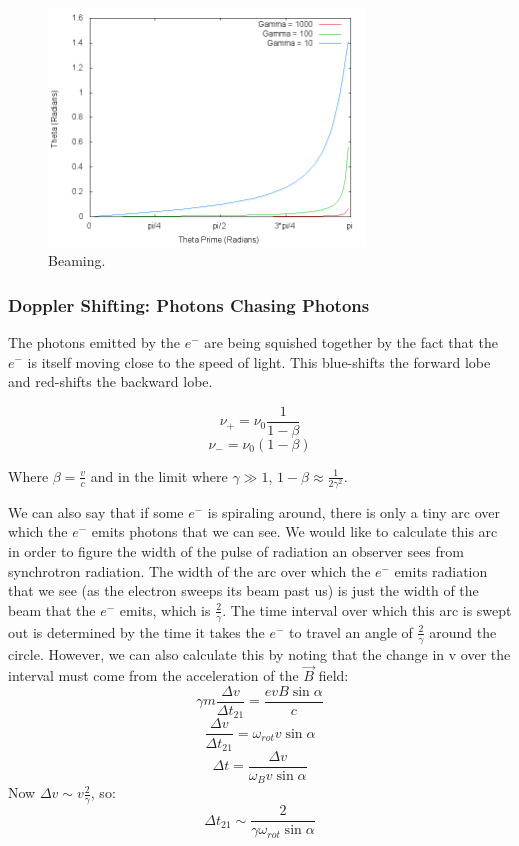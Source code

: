 \documentclass{article}
\begin{document}
\begin{figure}
    \centering
    \includegraphics[width=0.75\textwidth]{figures/Beam.png}
    \caption{Beaming.}
    \label{fig:beam}
\end{figure}

\subsubsection{Doppler Shifting: Photons Chasing Photons
}

The photons emitted by the $e^-$ are being squished together by the fact that
the $e^-$ is itself moving close to the speed of light. This blue-shifts the forward lobe and red-shifts the backward lobe.

$$\nu_+ = \nu_0 \frac{1}{ 1-\beta}$$
$$\nu_- = \nu_0 (1-\beta)$$

Where $\beta = \frac{v}{ c}$ and in the limit where $\gamma\gg1$, $1 - \beta \approx \frac{1}{ 2\gamma^2}$.

We can also say that if some $e^-$ is
spiraling around, there is only a tiny arc over which the $e^-$ emits
photons that we can see.  We would like to calculate this arc in order to
figure the width of the pulse of radiation an observer sees from synchrotron
radiation.  The width of the arc over which the $e^-$ emits radiation that
we see (as the electron sweeps its beam past us) is just the width of the
beam that the $e^-$ emits, which is $\frac{2}{\gamma}$.  The time interval
over which this arc is swept out is determined by the time it takes the
$e^-$ to travel an angle of $\frac{2}{\gamma}$ around the circle.  However, we can
also calculate this by noting that the change in v over the interval must
come from the acceleration of the $\vec B$ field:
$$\gamma m\frac{\Delta v}{\Delta t_{21}}=\frac{evB\sin\alpha}{ c}$$
$$\frac{\Delta v}{\Delta t_{21}}=\omega_{rot}v\sin\alpha$$
$$\Delta t=\frac{\Delta v}{ \omega_B v\sin\alpha}$$
Now $\Delta v\sim v\frac{2}{\gamma}$, so:
$$\boxed{\Delta t_{21}\sim\frac{2}{\gamma\omega_{rot}\sin\alpha}}$$
\end{document}
